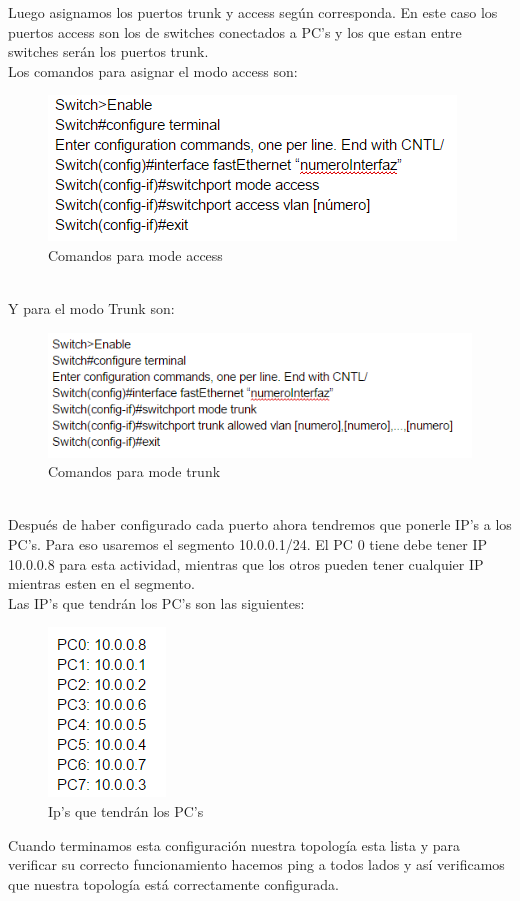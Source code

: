 \documentclass[onecolumn,11pts]{IEEEtran}
\begin{document}
Luego asignamos los puertos trunk y access según corresponda. En este caso los puertos access son los de switches conectados a PC's y los que estan entre switches serán los puertos trunk.\\
Los comandos para asignar el modo access son:
\begin{figure}[h!]
\centering
 \includegraphics[scale=0.8]{access}
\caption{Comandos para mode access}
\label{fig:acess}
\end{figure}

\\Y para el modo Trunk son:
\begin{figure}[h!]
\centering
 \includegraphics[scale=0.8]{trunk}
\caption{Comandos para mode trunk}
\label{fig:trunk}
\end{figure}
\\Después de haber configurado cada puerto ahora tendremos que ponerle IP's a los PC's. Para eso usaremos el segmento 10.0.0.1/24. El PC 0 tiene debe tener IP 10.0.0.8 para esta actividad, mientras que los otros pueden tener cualquier IP mientras esten en el segmento.\\
Las IP's que tendrán los PC's son las siguientes:

\begin{figure}[h!]
\centering
 \includegraphics[scale=0.8]{ipspc}
\caption{Ip's que tendrán los PC's}
\label{fig:ipspc}
\end{figure}
\newpage
Cuando terminamos esta configuración nuestra topología esta lista y para verificar su correcto funcionamiento hacemos ping a todos lados y así verificamos que nuestra topología está correctamente configurada.
\end{document}
